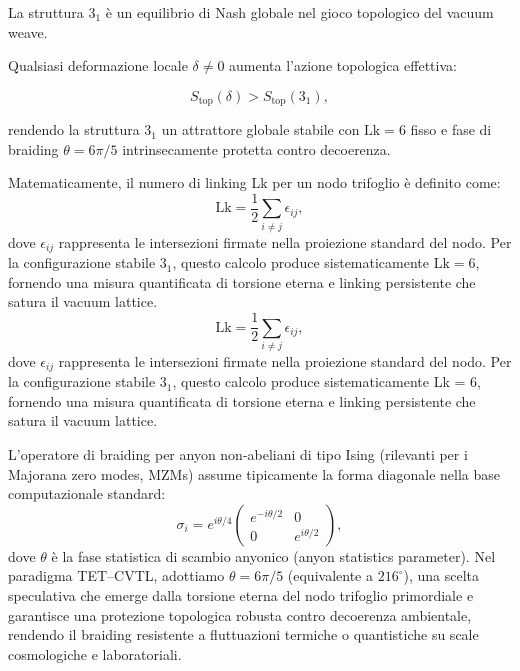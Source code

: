 \documentclass[11pt,a4paper]{article}
\theoremstyle{plain}
\theoremstyle{definition}
\begin{document}
\vspace{0.4cm}

\begin{tcolorbox}[
  colback=gray!10!white,
  colframe=blue!80!black,
  title={Assioma di Stabilità Eterna del Trefoil}
]
La struttura $3_1$ è un equilibrio di Nash globale nel gioco topologico del vacuum weave.  

Qualsiasi deformazione locale $\delta \neq 0$ aumenta l'azione topologica effettiva:

\begin{equation*}
S_{\text{top}}(\delta) > S_{\text{top}}(3_1),
\end{equation*}

rendendo la struttura $3_1$ un attrattore globale stabile con $\mathrm{Lk} = 6$ fisso e fase di braiding $\theta = 6\pi/5$ intrinsecamente protetta contro decoerenza.
\end{tcolorbox}





Matematicamente, il numero di linking Lk per un nodo trifoglio è definito come:
\begin{equation}
\mathrm{Lk} = \frac{1}{2} \sum_{i \neq j} \epsilon_{ij},
\end{equation}
dove $\epsilon_{ij}$ rappresenta le intersezioni firmate nella proiezione standard del nodo. Per la configurazione stabile $3_1$, questo calcolo produce sistematicamente $\mathrm{Lk} = 6$, fornendo una misura quantificata di torsione eterna e linking persistente che satura il vacuum lattice.
\begin{equation}
\mathrm{Lk} = \frac{1}{2} \sum_{i \neq j} \epsilon_{ij},
\end{equation}
dove $\epsilon_{ij}$ rappresenta le intersezioni firmate nella proiezione standard del nodo. Per la configurazione stabile 3$_1$, questo calcolo produce sistematicamente Lk = 6, fornendo una misura quantificata di torsione eterna e linking persistente che satura il vacuum lattice.

L'operatore di braiding per anyon non-abeliani di tipo Ising (rilevanti per i Majorana zero modes, MZMs) assume tipicamente la forma diagonale nella base computazionale standard:
\begin{equation}
\sigma_i = e^{i \theta / 4} \begin{pmatrix}
e^{-i \theta / 2} & 0 \\
0 & e^{i \theta / 2}
\end{pmatrix},
\end{equation}
dove $\theta$ è la fase statistica di scambio anyonico (anyon statistics parameter). Nel paradigma TET--CVTL, adottiamo $\theta = 6\pi/5$ (equivalente a $216^\circ$), una scelta speculativa che emerge dalla torsione eterna del nodo trifoglio primordiale e garantisce una protezione topologica robusta contro decoerenza ambientale, rendendo il braiding resistente a fluttuazioni termiche o quantistiche su scale cosmologiche e laboratoriali.
\end{document}
